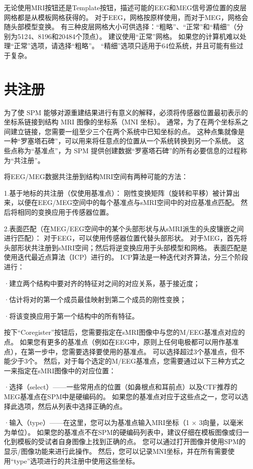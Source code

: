无论使用MRI按钮还是Template按钮，描述可能的EEG和MEG信号源位置的皮层网格都是从模板网格获得的。
对于EEG，网格按原样使用，而对于MEG，网格会随头部模型变换。
有三种皮层网格大小可供选择：“粗略”、“正常”和“精细”（分别为5124、8196和20484个顶点）。
建议使用“正常”网格。
如果您的计算机难以处理“正常”选项，请选择“粗略”。
“精细”选项只适用于64位系统，并且可能有些过于复杂。


\section{共注册}

为了使 SPM 能够对源重建结果进行有意义的解释，必须将传感器位置最初表示的坐标系链接到结构 MRI 图像的坐标系（MNI 坐标）。
通常，为了在两个坐标系之间建立链接，您需要一组至少三个在两个系统中已知坐标的点。
这种点集就像是一种“罗塞塔石碑”，可以用来将任意点的位置从一个系统转换到另一个系统。
这些点称为“基准点”，为 SPM 提供创建数据“罗塞塔石碑”的所有必要信息的过程称为“共注册”。

将EEG/MEG数据共注册到结构MRI空间有两种可能的方法：

1.基于地标的共注册（仅使用基准点）：
刚性变换矩阵（旋转和平移）被计算出来，以便在EEG/MEG空间中的每个基准点与sMRI空间中的对应基准点匹配。
然后将相同的变换应用于传感器位置。

2.表面匹配（在MEG/EEG空间中的某个头部形状与从sMRI派生的头皮镶嵌之间进行匹配）：
对于EEG，可以使用传感器位置代替头部形状。
对于MEG，首先将头部形状共注册到sMRI空间；然后将逆变换应用于头部模型和网格。
表面匹配是使用迭代最近点算法（ICP）进行的。
ICP算法是一种迭代对齐算法，分三个阶段进行：

·建立两个结构中要对齐的特征对之间的对应关系，基于接近度；

·估计将对的第一个成员最佳映射到第二个成员的刚性变换；

·将该变换应用于第一个结构中的所有特征。

按下“Coregister”按钮后，您需要指定在sMRI图像中与您的M/EEG基准点对应的点。
如果您有更多的基准点（例如在EEG中，原则上任何电极都可以用作基准点），在第一步中，您需要选择要使用的基准点。
可以选择超过3个基准点，但不能少于3个。
然后，对于每个选定的M/EEG基准点，您需要通过以下三种方式之一来指定在sMRI图像中的对应位置：

·选择（select）——一些常用点的位置（如鼻根点和耳前点）以及CTF推荐的MEG基准点在SPM中是硬编码的。
如果您的基准点对应于这些点之一，您可以选择此选项，然后从列表中选择正确的点。

·输入（type）——在这里，您可以为基准点输入MRI坐标（1 × 3向量，以毫米为单位）。
如果您的基准点不在SPM的硬编码列表中，建议仔细在模板图像或归一化到模板的受试者自身图像上找到正确的点。
您可以通过打开图像并使用SPM的显示/图像功能来进行此操作。
然后，您可以记录MNI坐标，并在所有需要使用“type”选项进行的共注册中使用这些坐标。

